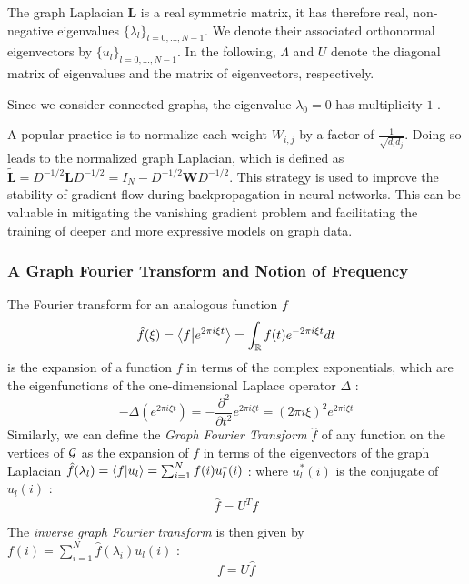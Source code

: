 The graph Laplacian $\mathbf{L}$ is a real symmetric matrix, it has therefore real, non-negative eigenvalues $\{\lambda_l\}_{l=0, \dots, N-1}$. 
We denote their associated  orthonormal eigenvectors by $\{u_l\}_{l=0,\dots, N-1}$. In the following, $\Lambda$ and $U$ denote the diagonal matrix of eigenvalues and the matrix of eigenvectors, respectively.

Since we consider connected graphs, the eigenvalue $\lambda_0=0$ has multiplicity $1$  \cite{shuman_emerging_2013}. 

A popular practice is to normalize each weight $W_{i, j}$ by a factor of $\frac{1}{\sqrt{d_id_j}}$.
Doing so leads to the normalized graph Laplacian, which is defined as $\widetilde{\mathbf{L}} = D^{-1/2}\mathbf{L}D^{-1/2} = I_N - D^{-1/2}\mathbf{W}D^{-1/2}$. This strategy is used to improve the stability of gradient flow during backpropagation in neural networks. This can be valuable in mitigating the vanishing gradient problem and facilitating the training of deeper and more expressive models on graph data.


\subsubsection{A Graph Fourier Transform and Notion of Frequency}
The Fourier transform for an analogous function $f$
$$
\hat{f}(\xi) = \left \langle f \middle| e^{2\pi i\xi t} \right \rangle = \int_{\mathbb{R}} f(t)e^{-2\pi i \xi t}dt
$$
is the expansion of a function $f$ in terms of the complex exponentials, which are the eigenfunctions of the one-dimensional Laplace operator $\Delta$ :
$$
-\Delta (e^{2\pi i \xi t}) = -\frac{\partial^2}{\partial t^2} e^{2\pi i \xi t} = (2\pi i\xi)^2 e^{2\pi i \xi t}
$$
Similarly, we can define the \textit{Graph Fourier Transform} $\hat{f}$ of any function on the vertices of $\mathcal{G}$ as the expansion of $f$ in terms of the eigenvectors of the graph Laplacian $\hat{f}(\lambda_l) = \left \langle f \middle| u_l \right \rangle = \sum_{i=1}^{N} f(i)u_l^*(i)$ : 
where $u_l^*(i)$ is the conjugate of $u_l(i)$ : 
\begin{equation}
    \hat{f} = U^Tf
\end{equation}

The \textit{inverse graph Fourier transform} is then given by $f(i) = \sum_{i=1}^{N} \hat{f}(\lambda_i)u_l(i)$ : 
\begin{equation}
    f = U\hat{f}
\end{equation}

